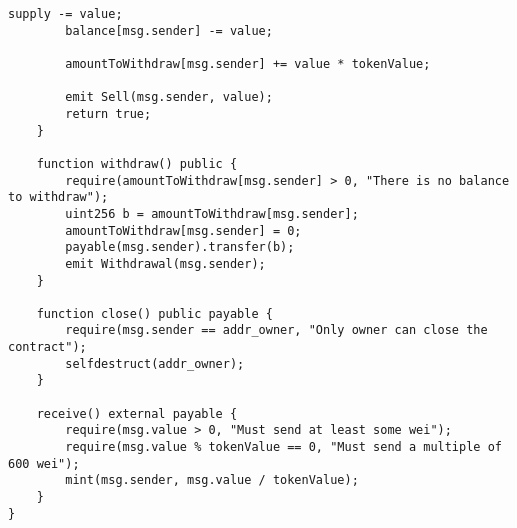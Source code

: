 \documentclass[12pt]{article}
\begin{document}
\begin{lstlisting}[language=Solidity]
        supply -= value; 
        balance[msg.sender] -= value;

        amountToWithdraw[msg.sender] += value * tokenValue;
        
        emit Sell(msg.sender, value);
        return true;
    }

    function withdraw() public {
        require(amountToWithdraw[msg.sender] > 0, "There is no balance to withdraw");
        uint256 b = amountToWithdraw[msg.sender];
        amountToWithdraw[msg.sender] = 0;
        payable(msg.sender).transfer(b);
        emit Withdrawal(msg.sender);
    }

    function close() public payable {
        require(msg.sender == addr_owner, "Only owner can close the contract");
        selfdestruct(addr_owner);
    }

    receive() external payable {
        require(msg.value > 0, "Must send at least some wei");
        require(msg.value % tokenValue == 0, "Must send a multiple of 600 wei");
        mint(msg.sender, msg.value / tokenValue);
    }
}
\end{lstlisting}
\end{document}
